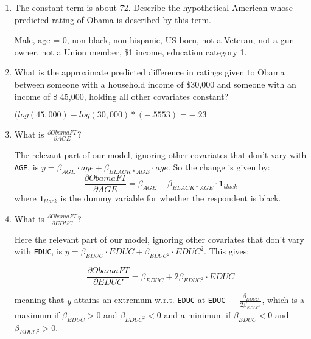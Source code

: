 \documentclass[12pt]{article}
\begin{document}
\begin{enumerate}
 \item The constant term is about 72. Describe the hypothetical American whose predicted rating of Obama is described by this term.
  
 \vspace{4mm}
 
Male, age = 0, non-black, non-hispanic, US-born, not a Veteran, not a gun owner, not a Union member, \$1 income, education category 1.

\vspace{5mm}
 
 \item What is the approximate predicted difference in ratings given to Obama between someone with a household income of \$30,000 and someone with an income of \$ 45,000, holding all other covariates constant?
 
$(log(45,000) - log(30,000) *(-.5553) = -.23$

\vspace{5mm}

\item What is $\frac{\partial ObamaFT}{\partial AGE}$?

The relevant part of our model, ignoring other covariates that don't vary with \verb|AGE|, is $y =  \beta_{AGE} \cdot age + \beta_{BLACK*AGE} \cdot age$. So the change is given by:
\[
\frac{\partial ObamaFT}{\partial AGE} = \beta_{AGE}  + \beta_{BLACK*AGE} \cdot \mathbf{1}_{black}
\]
where $\mathbf{1}_{black}$ is the dummy variable for whether the respondent is black.

\vspace{5mm}

\item What is $\frac{\partial ObamaFT}{\partial EDUC}$?

Here the relevant part of our model, ignoring other covariates that don't vary with \verb|EDUC|, is $y =  \beta_{EDUC} \cdot EDUC + \beta_{EDUC^2} \cdot EDUC^2$. This gives:

\[
\frac{\partial ObamaFT}{\partial EDUC} = \beta_{EDUC}  + 2\beta_{EDUC^2} \cdot EDUC
\]

meaning that $y$ attains an extremum  w.r.t. \verb|EDUC| at \verb|EDUC| $= \frac{\beta_{EDUC}}{2 \beta_{EDUC^2}}$, which is a maximum if $\beta_{EDUC} > 0$ and $\beta_{EDUC^2} < 0$ and a minimum if $\beta_{EDUC} < 0$ and $\beta_{EDUC^2} > 0$.

\end{enumerate}

\clearpage
\end{document}
